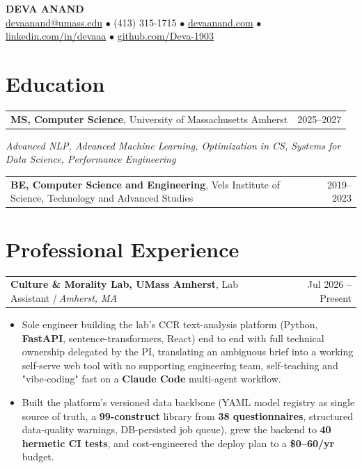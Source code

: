 \documentclass[letterpaper,11pt]{article}
\makeatletter
\newcommand{\eduItem}[3]{%
  \begin{tabular*}{\textwidth}{@{}l@{\extracolsep{\fill}}r@{}}
    \textbf{#1}, #2 & #3 \\
  \end{tabular*}\par
}
\newcommand{\expItem}[4]{%
  \vspace{2pt}
  \begin{tabular*}{\textwidth}{@{}l@{\extracolsep{\fill}}r@{}}
    \textbf{#1}, #2 \textit{| #3} & #4 \\
  \end{tabular*}\par\vspace{-3pt}
}
\makeatother
\begin{document}
\begin{center}
    {\fontsize{18}{20}\selectfont\bfseries DEVA ANAND}\\ \vspace{3pt}
    {\small
    \href{mailto:devaanand@umass.edu}{devaanand@umass.edu}
    \enspace$\bullet$\enspace
    (413) 315-1715
    \enspace$\bullet$\enspace
    \href{https://devaanand.com}{devaanand.com}
    \enspace$\bullet$\enspace
    \href{https://linkedin.com/in/devaaa/}{linkedin.com/in/devaaa}
    \enspace$\bullet$\enspace
    \href{https://github.com/Deva-1903}{github.com/Deva-1903}}
\end{center}
\vspace{-8pt}

\section{Education}
\eduItem{MS, Computer Science}{University of Massachusetts Amherst}{2025--2027}
{\small\textit{Advanced NLP, Advanced Machine Learning, Optimization in CS, Systems for Data Science, Performance Engineering}}\par
\vspace{3pt}
\eduItem{BE, Computer Science and Engineering}{Vels Institute of Science, Technology and Advanced Studies}{2019--2023}

\section{Professional Experience}

\expItem{Culture \& Morality Lab, UMass Amherst}{Lab Assistant}{Amherst, MA}{Jul 2026 -- Present}
\begin{itemize}
  \item Sole engineer building the lab's CCR text-analysis platform (Python, \textbf{FastAPI}, sentence-transformers, React) end to end with full technical ownership delegated by the PI, translating an ambiguous brief into a working self-serve web tool with no supporting engineering team, self-teaching and "vibe-coding" fast on a \textbf{Claude Code} multi-agent workflow.
  \item Built the platform's versioned data backbone (YAML model registry as single source of truth, a \textbf{99-construct} library from \textbf{38 questionnaires}, structured data-quality warnings, DB-persisted job queue), grew the backend to \textbf{40 hermetic CI tests}, and cost-engineered the deploy plan to a \textbf{\$0--60/yr} budget.
\end{itemize}
\end{document}
